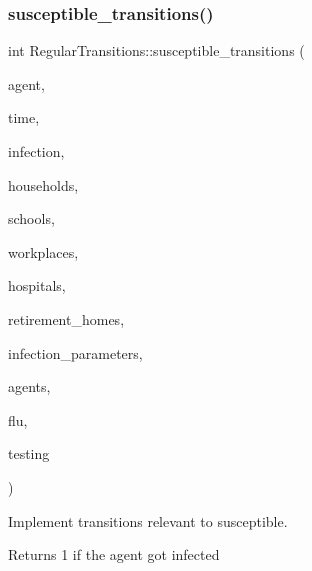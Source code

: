 \subsubsection{\texorpdfstring{susceptible\+\_\+transitions()}{susceptible\_transitions()}}
{\footnotesize\ttfamily int Regular\+Transitions\+::susceptible\+\_\+transitions (\begin{DoxyParamCaption}\item[{\hyperlink{classAgent}{Agent} \&}]{agent,  }\item[{const double}]{time,  }\item[{\hyperlink{classInfection}{Infection} \&}]{infection,  }\item[{std\+::vector$<$ \hyperlink{classHousehold}{Household} $>$ \&}]{households,  }\item[{std\+::vector$<$ \hyperlink{classSchool}{School} $>$ \&}]{schools,  }\item[{std\+::vector$<$ \hyperlink{classWorkplace}{Workplace} $>$ \&}]{workplaces,  }\item[{std\+::vector$<$ \hyperlink{classHospital}{Hospital} $>$ \&}]{hospitals,  }\item[{std\+::vector$<$ \hyperlink{classRetirementHome}{Retirement\+Home} $>$ \&}]{retirement\+\_\+homes,  }\item[{const std\+::map$<$ std\+::string, double $>$ \&}]{infection\+\_\+parameters,  }\item[{std\+::vector$<$ \hyperlink{classAgent}{Agent} $>$ \&}]{agents,  }\item[{\hyperlink{classFlu}{Flu} \&}]{flu,  }\item[{const \hyperlink{classTesting}{Testing} \&}]{testing }\end{DoxyParamCaption})}



Implement transitions relevant to susceptible. 

Returns 1 if the agent got infected \mbox{\label{classRegularTransitions_ae207e3f62417ace774bd2f8e043a14de}} 
